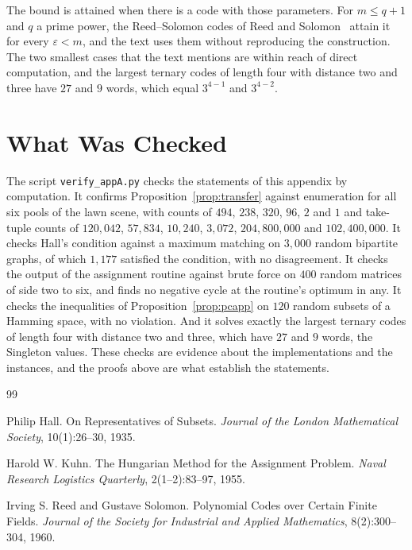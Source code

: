 \documentclass[11pt,twoside,openright]{book}
\theoremstyle{plain}
\theoremstyle{definition}
\theoremstyle{remark}
\begin{document}
The bound is attained when there is a code with those parameters. For $m\le q+1$ and $q$ a prime power, the Reed--Solomon codes of Reed and Solomon~\cite{reed1960} attain it for every $\varepsilon<m$, and the text uses them without reproducing the construction. The two smallest cases that the text mentions are within reach of direct computation, and the largest ternary codes of length four with distance two and three have $27$ and $9$ words, which equal $3^{4-1}$ and $3^{4-2}$.

\section{What Was Checked}\label{sec:checkapp}

The script \texttt{verify\_appA.py} checks the statements of this appendix by computation. It confirms Proposition~\ref{prop:transfer} against enumeration for all six pools of the lawn scene, with counts of $494$, $238$, $320$, $96$, $2$ and $1$ and take-tuple counts of $120{,}042$, $57{,}834$, $10{,}240$, $3{,}072$, $204{,}800{,}000$ and $102{,}400{,}000$. It checks Hall's condition against a maximum matching on $3{,}000$ random bipartite graphs, of which $1{,}177$ satisfied the condition, with no disagreement. It checks the output of the assignment routine against brute force on $400$ random matrices of side two to six, and finds no negative cycle at the routine's optimum in any. It checks the inequalities of Proposition~\ref{prop:pcapp} on $120$ random subsets of a Hamming space, with no violation. And it solves exactly the largest ternary codes of length four with distance two and three, which have $27$ and $9$ words, the Singleton values. These checks are evidence about the implementations and the instances, and the proofs above are what establish the statements.

\begin{thebibliography}{99}

Philip Hall.
\newblock On Representatives of Subsets.
\newblock \emph{Journal of the London Mathematical Society}, 10(1):26--30, 1935.

Harold W. Kuhn.
\newblock The Hungarian Method for the Assignment Problem.
\newblock \emph{Naval Research Logistics Quarterly}, 2(1--2):83--97, 1955.

Irving S. Reed and Gustave Solomon.
\newblock Polynomial Codes over Certain Finite Fields.
\newblock \emph{Journal of the Society for Industrial and Applied Mathematics}, 8(2):300--304, 1960.

\end{thebibliography}
\end{document}
